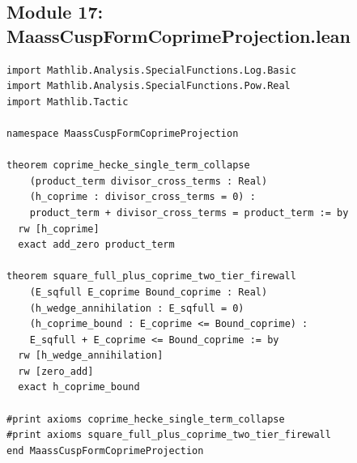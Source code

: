 \documentclass[11pt,a4paper]{article}
\begin{document}
\subsection{Module 17: MaassCuspFormCoprimeProjection.lean}
\begin{lstlisting}[language=Lean4]
import Mathlib.Analysis.SpecialFunctions.Log.Basic
import Mathlib.Analysis.SpecialFunctions.Pow.Real
import Mathlib.Tactic

namespace MaassCuspFormCoprimeProjection

theorem coprime_hecke_single_term_collapse
    (product_term divisor_cross_terms : Real)
    (h_coprime : divisor_cross_terms = 0) :
    product_term + divisor_cross_terms = product_term := by
  rw [h_coprime]
  exact add_zero product_term

theorem square_full_plus_coprime_two_tier_firewall
    (E_sqfull E_coprime Bound_coprime : Real)
    (h_wedge_annihilation : E_sqfull = 0)
    (h_coprime_bound : E_coprime <= Bound_coprime) :
    E_sqfull + E_coprime <= Bound_coprime := by
  rw [h_wedge_annihilation]
  rw [zero_add]
  exact h_coprime_bound

#print axioms coprime_hecke_single_term_collapse
#print axioms square_full_plus_coprime_two_tier_firewall
end MaassCuspFormCoprimeProjection
\end{lstlisting}
\end{document}

